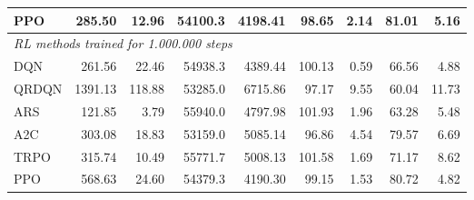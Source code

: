 \begin{samepage}
\begin{center}
\begin{tabular}{l|rr|rr|rr|rr}
    PPO          &   285.50 &    12.96 &    54100.3 &    4198.41 &   98.65 &    2.14 &   81.01 &    5.16 \\
    \midrule
    \multicolumn{9}{l}{\textit{RL methods trained for 1.000.000 steps}} \\
    \midrule
    DQN          &   261.56 &    22.46 &    54938.3 &    4389.44 &  100.13 &    0.59 &   66.56 &    4.88 \\
    QRDQN        &  1391.13 &   118.88 &    53285.0 &    6715.86 &   97.17 &    9.55 &   60.04 &   11.73 \\
    ARS          &   121.85 &     3.79 &    55940.0 &    4797.98 &  101.93 &    1.96 &   63.28 &    5.48 \\
    A2C          &   303.08 &    18.83 &    53159.0 &    5085.14 &   96.86 &    4.54 &   79.57 &    6.69 \\
    TRPO         &   315.74 &    10.49 &    55771.7 &    5008.13 &  101.58 &    1.69 &   71.17 &    8.62 \\
    PPO          &   568.63 &    24.60 &    54379.3 &    4190.30 &   99.15 &    1.53 &   80.72 &    4.82 \\
    \bottomrule
  \end{tabular}
\end{center}
\end{samepage}

